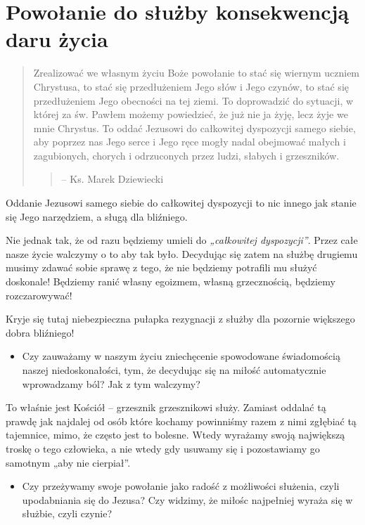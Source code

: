 \documentclass[a5paper,10pt,polish]{book}
\begin{document}
\section{Powołanie  do służby konsekwencją daru życia}
\label{miliardowice-2005-jesien/spotkanie1:powolanie-do-sluzby-konsekwencja-daru-zycia}\begin{quote}

Zrealizować we własnym życiu Boże powołanie to stać się wiernym uczniem Chrystusa, to stać się przedłużeniem Jego słów i Jego czynów, to stać się przedłużeniem Jego obecności na tej ziemi. To doprowadzić do sytuacji, w której za św. Pawłem możemy powiedzieć, że już nie ja żyję, lecz żyje we mnie Chrystus. To oddać Jezusowi do całkowitej dyspozycji samego siebie, aby poprzez nas Jego serce i Jego ręce mogły nadal obejmować małych i zagubionych, chorych i odrzuconych przez ludzi, słabych i grzeszników.
\begin{quote}

--  Ks. Marek Dziewiecki
\end{quote}
\end{quote}

Oddanie Jezusowi samego siebie do całkowitej dyspozycji  to nic innego jak stanie się Jego narzędziem, a sługą dla bliźniego.

Nie jednak tak, że od razu będziemy umieli do \emph{„całkowitej dyspozycji”}. Przez całe nasze życie walczymy o to aby tak  było. Decydując się zatem na służbę drugiemu musimy zdawać sobie sprawę z tego, że nie będziemy potrafili  mu służyć doskonale! Będziemy ranić własny egoizmem, własną grzecznością, będziemy rozczarowywać!

Kryje się tutaj niebezpieczna pułapka rezygnacji z służby dla pozornie większego dobra bliźniego!
\begin{itemize}
\item {} 
Czy zauważamy w naszym życiu zniechęcenie spowodowane świadomością naszej niedoskonałości, tym, że decydując  się na miłość automatycznie wprowadzamy ból? Jak z tym walczymy?

\end{itemize}

To właśnie jest Kościół – grzesznik grzesznikowi służy. Zamiast oddalać tą prawdę  jak najdalej  od osób które  kochamy powinniśmy razem z nimi zgłębiać tą tajemnice, mimo, że często  jest  to bolesne. Wtedy wyrażamy swoją największą troskę o tego człowieka, a nie wtedy gdy usuwamy się i pozostawiamy go samotnym „aby nie cierpiał”.
\begin{itemize}
\item {} 
Czy przeżywamy swoje powołanie jako radość z możliwości służenia, czyli upodabniania  się do Jezusa? Czy widzimy, że miłośc najpełniej wyraża się w służbie, czyli czynie?

\end{itemize}
\end{document}
